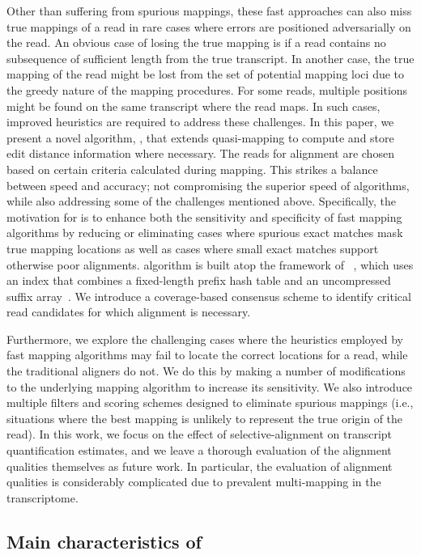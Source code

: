 Other than suffering from spurious mappings, these fast \nab approaches can also miss true 
mappings of a read in rare cases where errors are positioned adversarially on the read. 
An obvious case of losing the true mapping is if a read contains no subsequence of 
sufficient length from the true transcript. In another case, the true mapping of the 
read might be lost from the set of potential mapping loci due to the greedy nature of 
the mapping procedures. For some reads, multiple positions might be found on the same 
transcript where the read maps. In such cases, improved heuristics are required to address 
these challenges. In this paper, we present a novel algorithm, \sla, that extends 
quasi-mapping to compute and store edit distance information where necessary. The reads 
for alignment are chosen based on certain criteria calculated during mapping.  This strikes 
a balance between speed and accuracy; not compromising the superior speed of \nab 
algorithms, while also addressing some of the challenges mentioned above. Specifically, 
the motivation for \sla is to enhance both the sensitivity and specificity of fast mapping  
algorithms by reducing or eliminating cases where spurious exact matches mask true mapping 
locations as well as cases where small exact matches support otherwise poor alignments. 
\Sla algorithm is built atop the framework of \rapmap~\citep{Srivastava2016rapmap}, 
which uses an index that combines a fixed-length prefix hash table and an uncompressed 
suffix array~\citep{Manber:1993:Suffix}.  We introduce a coverage-based consensus 
scheme to identify critical read candidates for which alignment is necessary.

Furthermore, we explore the challenging cases where the heuristics employed by fast mapping 
algorithms may fail to locate the correct locations for a read, while the traditional 
aligners do not. We do this by making a number of modifications to the underlying mapping 
algorithm to increase its sensitivity.  We also introduce multiple filters and scoring 
schemes designed to eliminate spurious mappings (i.e., situations where the best mapping 
is unlikely to represent the true origin of the read). In this work, we focus on the effect 
of selective-alignment on transcript quantification estimates, and we leave a thorough 
evaluation of the alignment qualities themselves as future work. In particular, the 
evaluation of alignment qualities is considerably complicated due to prevalent 
multi-mapping in the transcriptome.

\subsection{Main characteristics of \sla}

